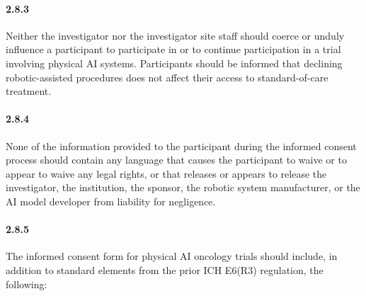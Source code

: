 \documentclass[11pt]{article}
\begin{document}
\paragraph{2.8.3} Neither the investigator nor the investigator site staff should coerce or unduly influence a participant to participate in or to continue participation in a trial involving physical AI systems. Participants should be informed that declining robotic-assisted procedures does not affect their access to standard-of-care treatment.

\paragraph{2.8.4} None of the information provided to the participant during the informed consent process should contain any language that causes the participant to waive or to appear to waive any legal rights, or that releases or appears to release the investigator, the institution, the sponsor, the robotic system manufacturer, or the AI model developer from liability for negligence.

\paragraph{2.8.5} The informed consent form for physical AI oncology trials should include, in addition to standard elements from the prior ICH E6(R3) regulation, the following:
\end{document}
